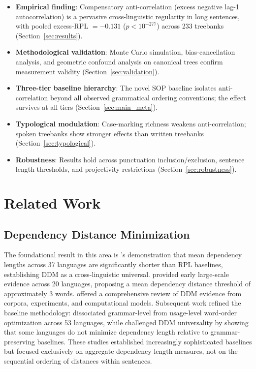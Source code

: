 \documentclass[11pt,letterpaper]{article}
\begin{document}
\begin{itemize}
  \item \textbf{Empirical finding}: Compensatory anti-correlation (excess negative lag-1 autocorrelation) is a pervasive cross-linguistic regularity in long sentences, with pooled excess-RPL $= -0.131$ ($p < 10^{-277}$) across 233 treebanks (Section~\ref{sec:results}).
  \item \textbf{Methodological validation}: Monte Carlo simulation, bias-cancellation analysis, and geometric confound analysis on canonical trees confirm measurement validity (Section~\ref{sec:validation}).
  \item \textbf{Three-tier baseline hierarchy}: The novel SOP baseline isolates anti-correlation beyond all observed grammatical ordering conventions; the effect survives at all tiers (Section~\ref{sec:main_meta}).
  \item \textbf{Typological modulation}: Case-marking richness weakens anti-correlation; spoken treebanks show stronger effects than written treebanks (Section~\ref{sec:typological}).
  \item \textbf{Robustness}: Results hold across punctuation inclusion/exclusion, sentence length thresholds, and projectivity restrictions (Section~\ref{sec:robustness}).
\end{itemize}

\section{Related Work}

\subsection{Dependency Distance Minimization}

The foundational result in this area is \citet{Futrell2015}'s demonstration that mean dependency lengths across 37 languages are significantly shorter than RPL baselines, establishing DDM as a cross-linguistic universal. \citet{Liu2017} provided early large-scale evidence across 20 languages, proposing a mean dependency distance threshold of approximately 3 words. \citet{Temperley2018} offered a comprehensive review of DDM evidence from corpora, experiments, and computational models. Subsequent work refined the baseline methodology: \citet{Futrell2020a} dissociated grammar-level from usage-level word-order optimization across 53 languages, while \citet{Yadav2022} challenged DDM universality by showing that some languages do not minimize dependency length relative to grammar-preserving baselines. These studies established increasingly sophisticated baselines but focused exclusively on aggregate dependency length measures, not on the sequential ordering of distances within sentences.
\end{document}
